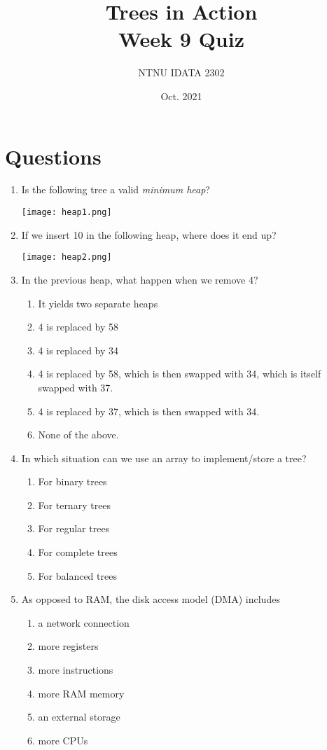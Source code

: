 \documentclass[11pt]{article}
\author{NTNU IDATA 2302}
\date{Oct. 2021}
\title{Trees in Action\\\medskip
\large Week 9 Quiz}
\begin{document}
\maketitle


\section{Questions}
\label{sec:org87daccd}

\begin{enumerate}
\item Is the following tree a valid \emph{minimum heap}?

\begin{center}
\texttt{[image: heap1.png]}
\end{center}

\item If we insert 10 in the following heap, where does it end up?

\begin{center}
\texttt{[image: heap2.png]}
\end{center}

\item In the previous heap, what happen when we remove 4?
\begin{enumerate}
\item It yields two separate heaps
\item 4 is replaced by 58
\item 4 is replaced by 34
\item 4 is replaced by 58, which is then swapped with 34, which is itself swapped with 37.
\item 4 is replaced by 37, which is then swapped with 34.
\item None of the above.
\end{enumerate}

\item In which situation can we use an array to implement/store a tree?
\begin{enumerate}
\item For binary trees
\item For ternary trees
\item For regular trees
\item For complete trees
\item For balanced trees
\end{enumerate}

\item As opposed to RAM, the disk access model (DMA) includes
\begin{enumerate}
\item a network connection
\item more registers
\item more instructions
\item more RAM memory
\item an external storage
\item more CPUs
\end{enumerate}


\end{enumerate}
\end{document}
